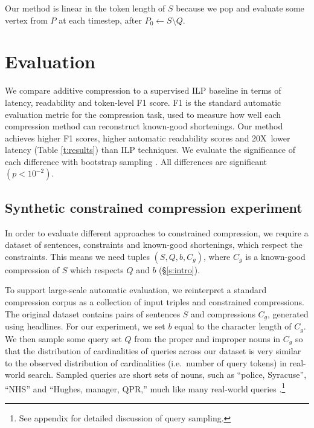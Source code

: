 \documentclass[11pt,a4paper]{article}
\newcommand{\speedup}[0]{20X~}
\begin{document}
Our method is linear in the token length of $S$ because we pop and evaluate some vertex from $P$ at each timestep, after $P_0  \gets S \setminus Q$.

\section{Evaluation}\label{s:autoeval}

We compare additive compression to a supervised ILP baseline in terms of latency, readability and token-level F1 score. F1 is the standard automatic evaluation metric for the compression task, used to measure how well each compression method can reconstruct known-good shortenings. Our method achieves higher F1 scores, higher automatic readability scores and \speedup lower latency (Table \ref{t:results}) than ILP techniques. We evaluate the significance of each difference with bootstrap sampling \cite{D12-1091}. All differences are significant {\small $(p < 10^{-2})$}. 

\subsection{Synthetic constrained compression experiment}\label{s:constrained}

In order to evaluate different approaches to constrained compression, we require a dataset of sentences, constraints and known-good shortenings, which respect the constraints. This means we need tuples $(S, Q, b, C_g)$, where $C_g$ is a known-good compression of $S$ which respects $Q$ and $b$ (\S\ref{s:intro}).

To support large-scale automatic evaluation, we reinterpret a standard compression corpus \cite{filippova2013overcoming}
as a collection of input triples and constrained compressions. The original dataset contains pairs of sentences $S$ and compressions $C_g$, generated using headlines. For our experiment, we set $b$ equal to  the character length of $C_g$. We then sample some query set $Q$ from the proper and improper nouns in $C_g$ so that the distribution of cardinalities of queries across our dataset is very similar to the observed distribution \cite{Jansen2000RealLR} of cardinalities (i.e.\ number of query tokens) in real-world search. Sampled queries are short sets of nouns, such as ``police, Syracuse'', ``NHS'' and ``Hughes, manager, QPR,'' much like many real-world queries \cite{Barr2008TheLS}.\footnote{See appendix for detailed discussion of query sampling.} 
\end{document}

